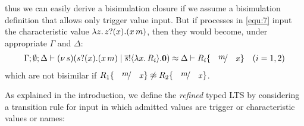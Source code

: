 \documentclass[a4paper,UKenglish]{lipics}
\theoremstyle{definition}
\begin{document}
\begin{example}
\noi thus we can easily derive a bisimulation closure if we 
assume a bisimulation definition that allows only trigger value input.
%
But if processes in \eqref{equ:7}
input the characteristic value $\lambda z.\,z ? (x) . (x\, {m})$,  
then they would become, under appropriate $\Gamma$ and $\Delta$:
%
\begin{eqnarray*}
	\Gamma; \es; \Delta \proves \newsp{s}{\binp{s}{x} (\appl{x}{m}) \Par \bout{\dual{s}}{\abs{x} R_i} \inact} \wbc \Delta \proves R_i \subst{m}{x}
\quad (i=1,2)
\end{eqnarray*}
\noi which are not bisimilar if $R_1 \subst{m}{x} \not\wbc R_2 \subst{m}{x}$.
\end{example}

\noi As explained in 
the introduction,
we define the
\emph{refined} typed LTS
by considering a transition rule for input in which admitted values are
trigger or characteristic values or names:

\end{document}

